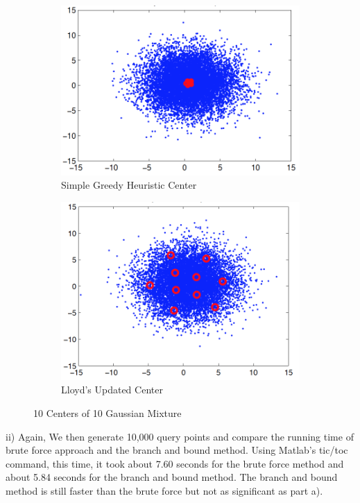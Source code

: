 \documentclass[12pt]{article}
\begin{document}
\begin{figure}[H]
\centering
\begin{subfigure}{.5\textwidth}
  \centering
   \includegraphics[scale = 0.5]{10.jpg}
  \caption{Simple Greedy Heuristic Center}
  \label{fig:8}
\end{subfigure}%
\begin{subfigure}{.5\textwidth}
  \centering
   \includegraphics[scale = 0.5]{11.jpg}
  \caption{Lloyd's Updated Center}
  \label{fig:9}
\end{subfigure}
\caption{10 Centers of 10 Gaussian Mixture}
\label{fig:test}
\end{figure}
\indent ii) Again, We then generate 10,000 query points and compare the running time of brute force approach and the branch and bound method. Using Matlab's tic/toc command, this time, it took about 7.60 seconds for the brute force method and about 5.84 seconds for the branch and bound method. The branch and bound method is still faster than the brute force but not as significant as part a).\\\\
\end{document}
